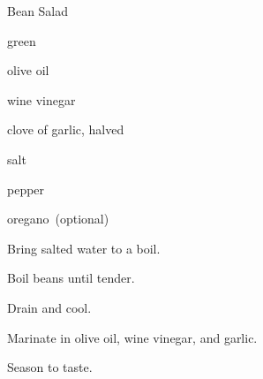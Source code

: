 \begin{recipe}{Bean Salad}{}{}

\begin{ingredients}
\item green 
\item olive oil
\item wine vinegar
\item clove of garlic, halved
\item salt
\item pepper
\item oregano~(optional)
\end{ingredients}

\begin{directions}
\item Bring salted water to a boil.
\item Boil beans until tender.
\item Drain and cool.
\item Marinate in olive oil, wine vinegar, and garlic.
\item Season to taste.
\end{directions}

\end{recipe}
